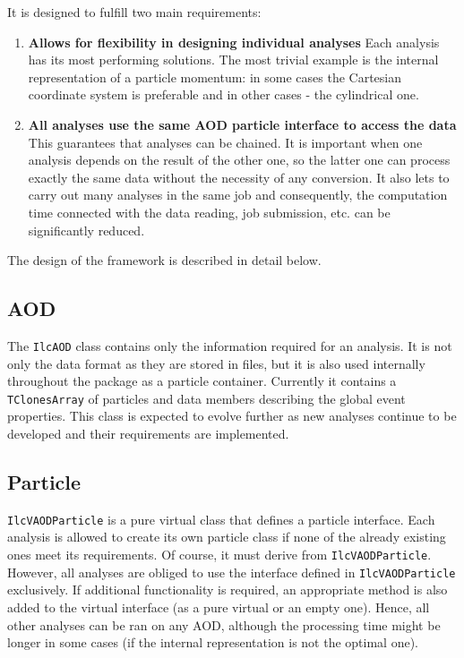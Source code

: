\documentclass[12pt,a4paper,twoside]{article}
\begin{document}
{It is designed to fulfill two main requirements:
% 
\begin{enumerate}
\item \textbf{Allows for flexibility in designing individual analyses} 
  Each analysis has its most performing solutions. The most trivial example is 
  the internal representation of a particle momentum: in some cases the Cartesian coordinate system  is preferable and in other cases - the cylindrical one.
\item \textbf{All analyses use the same AOD particle interface to access the data }
  This guarantees that analyses can be chained. It is important when
  one analysis depends on the result of the other one, so the latter one can 
  process exactly the same data without the necessity of any conversion. 
  It also lets to carry out many analyses in the same job and consequently, the 
  computation time connected with 
  the data reading, job submission, etc. can be significantly reduced.
\end{enumerate}
The design of the framework is described in detail below.



\subsection{AOD}

The \texttt{IlcAOD} class contains only the information required
for an analysis. It is not only the data format as they are
stored in files, but it is also used internally throughout the package
as a particle container.  
Currently it contains a \texttt{TClonesArray} of particles and 
data members describing the global event properties. 
This class is expected to evolve further as new analyses continue to be 
developed and their requirements are implemented. 


\subsection{Particle}

\texttt{IlcVAODParticle} is a pure virtual class that defines a particle
interface.
Each analysis is allowed to create its own particle class 
if none of the already existing ones meet its requirements. 
Of course, it must derive  from \texttt{IlcVAODParticle}. 
However, all analyses are obliged to 
use the interface defined in \texttt{IlcVAODParticle} exclusively.
If additional functionality is required, an appropriate 
method is also added to the virtual interface (as a pure virtual or an empty one).
Hence, all other analyses can be ran on any AOD, although the processing time 
might be longer in some cases (if the internal representation is not 
the optimal one).

}
\end{document}
